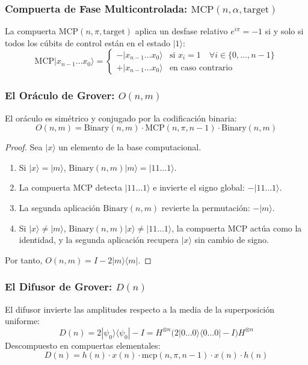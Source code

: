 \documentclass[11pt,a4paper]{article}
\begin{document}
\subsubsection{Compuerta de Fase Multicontrolada: \texorpdfstring{$\text{MCP}(n, \alpha, \text{target})$}{MCP(n, alpha, target)}}
La compuerta $\text{MCP}(n, \pi, \text{target})$ aplica un desfase relativo $e^{i\pi} = -1$ si y solo si todos los cúbits de control están en el estado $|1\rangle$:
\begin{equation}
    \text{MCP}|x_{n-1}\dots x_0\rangle = 
    \begin{cases} 
        -|x_{n-1}\dots x_0\rangle & \text{si } x_i = 1 \quad \forall i \in \{0, \dots, n-1\} \\ 
        +|x_{n-1}\dots x_0\rangle & \text{en caso contrario} 
    \end{cases}
\end{equation}

\subsubsection{El Oráculo de Grover: \texorpdfstring{$O(n, m)$}{O(n, m)}}
El oráculo es simétrico y conjugado por la codificación binaria:
\begin{equation}
    O(n, m) = \text{Binary}(n, m) \cdot \text{MCP}(n, \pi, n-1) \cdot \text{Binary}(n, m)
\end{equation}
\begin{proof}
Sea $|x\rangle$ un elemento de la base computacional.
\begin{enumerate}
    \item Si $|x\rangle = |m\rangle$, $\text{Binary}(n, m)|m\rangle = |11\dots 1\rangle$.
    \item La compuerta $\text{MCP}$ detecta $|11\dots 1\rangle$ e invierte el signo global: $-|11\dots 1\rangle$.
    \item La segunda aplicación $\text{Binary}(n, m)$ revierte la permutación: $-|m\rangle$.
    \item Si $|x\rangle \neq |m\rangle$, $\text{Binary}(n, m)|x\rangle \neq |11\dots 1\rangle$, la compuerta $\text{MCP}$ actúa como la identidad, y la segunda aplicación recupera $|x\rangle$ sin cambio de signo.
\end{enumerate}
Por tanto, $O(n, m) = I - 2|m\rangle\langle m|$.
\end{proof}

\subsubsection{El Difusor de Grover: \texorpdfstring{$D(n)$}{D(n)}}
El difusor invierte las amplitudes respecto a la media de la superposición uniforme:
\begin{equation}
    D(n) = 2|\psi_0\rangle\langle\psi_0| - I = H^{\otimes n} \big( 2|0\dots 0\rangle\langle 0\dots 0| - I \big) H^{\otimes n}
\end{equation}
Descompuesto en compuertas elementales:
\begin{equation}
    D(n) = h(n) \cdot x(n) \cdot \text{mcp}(n, \pi, n-1) \cdot x(n) \cdot h(n)
\end{equation}
\end{document}
